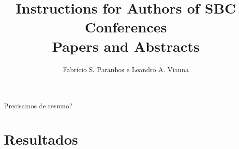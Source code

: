 \documentclass[12pt]{article}
\title{Instructions for Authors of SBC Conferences\\ Papers and Abstracts}
\author{Fabrício S. Paranhos\inst{1} e Leandro A. Vianna\inst{1}}
\begin{document}
 

\maketitle

     
\begin{resumo} 
Precisamos de resumo?
\end{resumo}


\section{Resultados} \label{sec:res}







\end{document}
